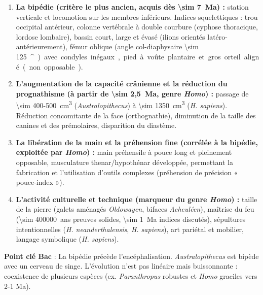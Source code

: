 \documentclass[11pt]{article}
\providecommand{\degree}{^{\circ}}
\newcommand{\cle}[1]{{\popxbold\color{popdark}#1}}
\begin{document}
\begin{propriete}
\begin{enumerate}
\item \textbf{La bipédie (critère le plus ancien, acquis dès \SI{\sim 7}{Ma}) :} station verticale et locomotion sur les membres inférieurs. Indices squelettiques : trou occipital antérieur, colonne vertébrale à double courbure (cyphose thoracique, lordose lombaire), bassin court, large et évasé (ilions orientés latéro-antérieurement), fémur oblique (angle col-diaphysaire \SI{\sim 125}{\degree}) avec condyles inégaux, pied à voûte plantaire et gros orteil aligné (non opposable).
\item \textbf{L'augmentation de la capacité crânienne et la réduction du prognathisme (à partir de \SI{\sim 2,5}{Ma}, genre \emph{Homo}) :} passage de \SI{\sim 400-500}{cm^3} (\emph{Australopithecus}) à \SI{\sim 1350}{cm^3} (\emph{H. sapiens}). Réduction concomitante de la face (orthognathie), diminution de la taille des canines et des prémolaires, disparition du diastème.
\item \textbf{La libération de la main et la préhension fine (corrélée à la bipédie, exploitée par \emph{Homo}) :} main préhensile à pouce long et pleinement opposable, musculature thenar/hypothénar développée, permettant la fabrication et l'utilisation d'outils complexes (préhension de précision « pouce-index »).
\item \textbf{L'activité culturelle et technique (marqueur du genre \emph{Homo}) :} taille de la pierre (galets aménagés \emph{Oldowayen}, bifaces \emph{Acheuléen}), maîtrise du feu (\SI{\sim 400000}{ans} preuves solides, \SI{\sim 1}{Ma} indices discutés), sépultures intentionnelles (\emph{H. neanderthalensis}, \emph{H. sapiens}), art pariétal et mobilier, langage symbolique (\emph{H. sapiens}).
\end{enumerate}
\textbf{Point clé Bac} : La bipédie précède l'encéphalisation. \emph{Australopithecus} est bipède avec un cerveau de singe. L'évolution n'est pas linéaire mais \cle{buissonnante} : coexistence de plusieurs espèces (ex. \emph{Paranthropus} robustes et \emph{Homo} graciles vers 2-1 Ma).
\end{propriete}
\end{document}
